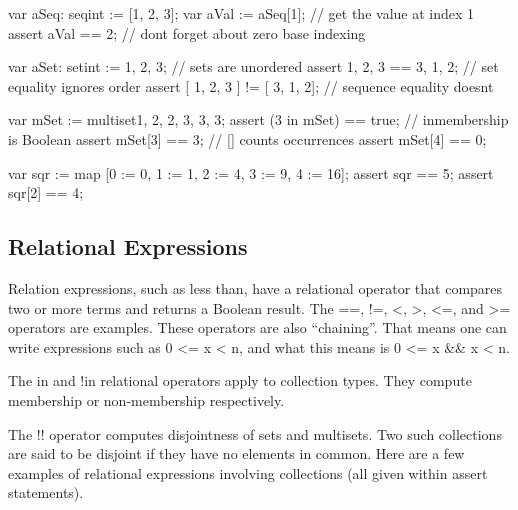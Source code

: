 \documentclass[letterpaper,10pt,english]{sphinxmanual}
\begin{document}
\begin{sphinxVerbatim}[commandchars=\\\{\}]
var aSeq: seq\PYGZlt{}int\PYGZgt{} := [1, 2, 3];
var aVal := aSeq[1];    // get the value at index 1
assert aVal == 2;       // don\PYGZsq{}t forget about zero base indexing

var aSet: set\PYGZlt{}int\PYGZgt{} := \PYGZob{} 1, 2, 3\PYGZcb{};   // sets are unordered
assert \PYGZob{} 1, 2, 3 \PYGZcb{} == \PYGZob{} 3, 1, 2\PYGZcb{};   // set equality ignores order
assert [ 1, 2, 3 ] != [ 3, 1, 2];   // sequence equality doesn\PYGZsq{}t

var mSet := multiset\PYGZob{}1, 2, 2, 3, 3, 3\PYGZcb{};
assert (3 in mSet) == true;         // in\PYGZhy{}membership is Boolean
assert mSet[3] == 3;                // [] counts occurrences
assert mSet[4] == 0;

var sqr := map [0 := 0, 1 := 1, 2 := 4, 3 := 9, 4 := 16];
assert \textbar{}sqr\textbar{} == 5;
assert sqr[2] == 4;
\end{sphinxVerbatim}


\subsection{Relational Expressions}
\label{\detokenize{06-dafny-language:relational-expressions}}
Relation expressions, such as less than, have a relational operator
that compares two or more terms and returns a Boolean result. The ==,
!=, \textless{}, \textgreater{}, \textless{}=, and \textgreater{}= operators are examples. These operators are also
“chaining”. That means one can write expressions such as 0 \textless{}= x \textless{} n,
and what this means is 0 \textless{}= x \&\& x \textless{} n.

The in and !in relational operators apply to collection types. They
compute membership or non-membership respectively.

The !! operator computes disjointness of sets and multisets. Two such
collections are said to be disjoint if they have no elements in
common. Here are a few examples of relational expressions involving
collections (all given within assert statements).
\end{document}
